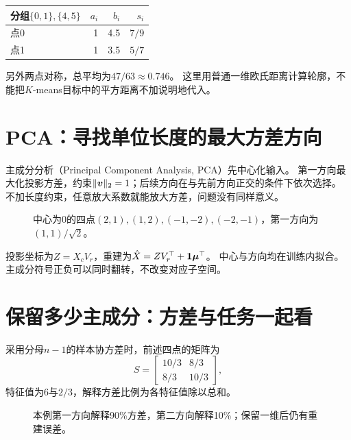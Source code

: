 \begin{center}
\begin{tabular}{lrrr}
\toprule
分组$\{0,1\},\{4,5\}$ & $a_i$ & $b_i$ & $s_i$\\
\midrule
点0 & 1 & 4.5 & $7/9$\\
点1 & 1 & 3.5 & $5/7$\\
\bottomrule
\end{tabular}
\end{center}
另外两点对称，总平均为$47/63\approx0.746$。
这里用普通一维欧氏距离计算轮廓，不能把$K$-means目标中的平方距离不加说明地代入。



\section{PCA：寻找单位长度的最大方差方向}
\label{sec:unsup-pca}
主成分分析（Principal Component Analysis, PCA）先中心化输入。
第一方向最大化投影方差，约束$\lVert\boldsymbol{v}\rVert_2=1$；后续方向在与先前方向正交的条件下依次选择。
不加长度约束，任意放大系数就能放大方差，问题没有同样意义。

\begin{figure}[htbp]
\centering
\caption{中心为0的四点$(2,1),(1,2),(-1,-2),(-2,-1)$，第一方向为$(1,1)/\sqrt2$。}
\par\smallskip
{}
\end{figure}

投影坐标为$Z=X_cV_r$，重建为$\hat X=ZV_r^\top+\boldsymbol{1}\boldsymbol{\mu}^\top$。
中心与方向均在训练内拟合。主成分符号正负可以同时翻转，不改变对应子空间。

\section{保留多少主成分：方差与任务一起看}
\label{sec:unsup-components}
采用分母$n-1$的样本协方差时，前述四点的矩阵为
\[
 S=\begin{bmatrix}10/3&8/3\\8/3&10/3\end{bmatrix},
\]
特征值为6与$2/3$，解释方差比例为各特征值除以总和。

\begin{figure}[htbp]
\centering
\caption{本例第一方向解释90\%方差，第二方向解释10\%；保留一维后仍有重建误差。}
\par\smallskip
{}
\end{figure}

